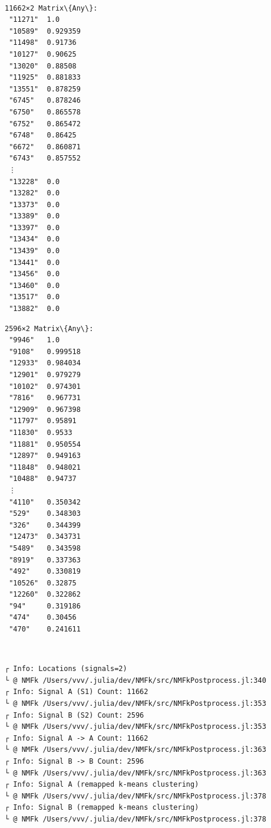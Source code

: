 \documentclass[11pt]{article}
\begin{document}
    \begin{center}
    \end{center}
    { \hspace*{\fill} \\}

    \begin{Verbatim}[commandchars=\\\{\}]

    \end{Verbatim}


    \begin{Verbatim}[commandchars=\\\{\}]
11662×2 Matrix\{Any\}:
 "11271"  1.0
 "10589"  0.929359
 "11498"  0.91736
 "10127"  0.90625
 "13020"  0.88508
 "11925"  0.881833
 "13551"  0.878259
 "6745"   0.878246
 "6750"   0.865578
 "6752"   0.865472
 "6748"   0.86425
 "6672"   0.860871
 "6743"   0.857552
 ⋮
 "13228"  0.0
 "13282"  0.0
 "13373"  0.0
 "13389"  0.0
 "13397"  0.0
 "13434"  0.0
 "13439"  0.0
 "13441"  0.0
 "13456"  0.0
 "13460"  0.0
 "13517"  0.0
 "13882"  0.0
    \end{Verbatim}



    \begin{Verbatim}[commandchars=\\\{\}]
2596×2 Matrix\{Any\}:
 "9946"   1.0
 "9108"   0.999518
 "12933"  0.984034
 "12901"  0.979279
 "10102"  0.974301
 "7816"   0.967731
 "12909"  0.967398
 "11797"  0.95891
 "11830"  0.9533
 "11881"  0.950554
 "12897"  0.949163
 "11848"  0.948021
 "10488"  0.94737
 ⋮
 "4110"   0.350342
 "529"    0.348303
 "326"    0.344399
 "12473"  0.343731
 "5489"   0.343598
 "8919"   0.337363
 "492"    0.330819
 "10526"  0.32875
 "12260"  0.322862
 "94"     0.319186
 "474"    0.30456
 "470"    0.241611
    \end{Verbatim}


    \begin{center}
    \end{center}
    { \hspace*{\fill} \\}

    \begin{Verbatim}[commandchars=\\\{\}]
┌ Info: Locations (signals=2)
└ @ NMFk /Users/vvv/.julia/dev/NMFk/src/NMFkPostprocess.jl:340
┌ Info: Signal A (S1) Count: 11662
└ @ NMFk /Users/vvv/.julia/dev/NMFk/src/NMFkPostprocess.jl:353
┌ Info: Signal B (S2) Count: 2596
└ @ NMFk /Users/vvv/.julia/dev/NMFk/src/NMFkPostprocess.jl:353
┌ Info: Signal A -> A Count: 11662
└ @ NMFk /Users/vvv/.julia/dev/NMFk/src/NMFkPostprocess.jl:363
┌ Info: Signal B -> B Count: 2596
└ @ NMFk /Users/vvv/.julia/dev/NMFk/src/NMFkPostprocess.jl:363
┌ Info: Signal A (remapped k-means clustering)
└ @ NMFk /Users/vvv/.julia/dev/NMFk/src/NMFkPostprocess.jl:378
┌ Info: Signal B (remapped k-means clustering)
└ @ NMFk /Users/vvv/.julia/dev/NMFk/src/NMFkPostprocess.jl:378
    \end{Verbatim}
\end{document}

